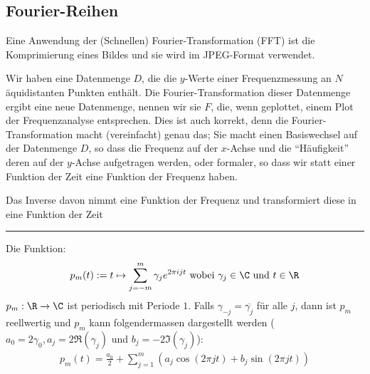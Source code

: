 
%
\subsection{Fourier-Reihen}
Eine Anwendung der (Schnellen) Fourier-Transformation (FFT) ist die Komprimierung eines Bildes und sie wird im JPEG-Format verwendet.

\inlineintuition Wir haben eine Datenmenge $D$, die die $y$-Werte einer Frequenzmessung an $N$ äquidistanten Punkten enthält.
Die Fourier-Transformation dieser Datenmenge ergibt eine neue Datenmenge, nennen wir sie $F$, die, wenn geplottet, einem Plot der Frequenzanalyse entsprechen.
Dies ist auch korrekt, denn die Fourier-Transformation macht (vereinfacht) genau das;
Sie macht einen Basiswechsel auf der Datenmenge $D$, so dass die Frequenz auf der $x$-Achse und die ``Häufigkeit'' deren auf der $y$-Achse aufgetragen werden,
oder formaler, so dass wir statt einer Funktion der Zeit eine Funktion der Frequenz haben.

Das Inverse davon nimmt eine Funktion der Frequenz und transformiert diese in eine Funktion der Zeit

\vspace{0.3cm}
\hrule
\vspace{0.2cm}

 Die Funktion:
\rmvspace
\begin{align*}
    p_m(t) := t \mapsto \sum_{j = -m}^{m} \gamma_j e^{2 \pi ijt} \text{ wobei } \gamma_j \in \C \text{ und } t \in \R
\end{align*}
%
%
\inlineremark $p_m : \R \rightarrow \C$ ist periodisch mit Periode $1$.
Falls $\gamma_{-j} = \overline{\gamma_j}$ für alle $j$, dann ist $p_m$ reellwertig und
$p_m$ kann folgendermassen dargestellt werden ($a_0 = 2\gamma_0, a_j = 2\Re(\gamma_j)$ und $b_j = -2\Im(\gamma_j)$):
\rmvspace
\begin{align*}
    p_m(t) = \frac{a_0}{2} + \sum_{j = 1}^{m} (a_j \cos(2\pi jt) + b_j \sin(2\pi jt))
\end{align*}

